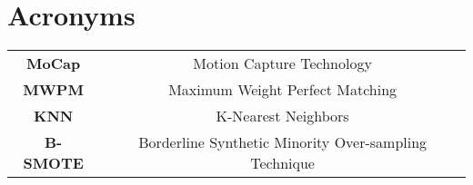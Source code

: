 \section*{\Huge Acronyms}



\begin{table}[H]
    \begin{tabular}{c c}
        \textbf{MoCap} & Motion Capture Technology \\
        \textbf{MWPM} & Maximum Weight Perfect Matching \\
        \textbf{KNN} & K-Nearest Neighbors \\
        \textbf{B-SMOTE} & Borderline Synthetic Minority Over-sampling Technique \\
    \end{tabular}
\end{table}